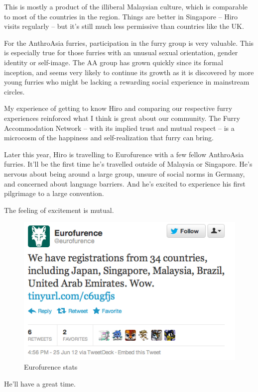 This is mostly a product of the illiberal Malaysian culture, which is comparable to most of the countries in the region. Things are better in Singapore -- Hiro visits regularly -- but it's still much less permissive than countries like the UK.

For the AnthroAsia furries, participation in the furry group is very valuable. This is especially true for those furries with an unusual sexual orientation, gender identity or self-image. The AA group has grown quickly since its formal inception, and seems very likely to continue its growth as it is discovered by more young furries who might be lacking a rewarding social experience in mainstream circles.

My experience of getting to know Hiro and comparing our respective furry experiences reinforced what I think is great about our community. The Furry Accommodation Network -- with its implied trust and mutual respect -- is a microcosm of the happiness and self-realization that furry can bring.

Later this year, Hiro is travelling to Eurofurence with a few fellow AnthroAsia furries. It'll be the first time he's travelled outside of Malaysia or Singapore. He's nervous about being around a large group, unsure of social norms in Germany, and concerned about language barriers. And he's excited to experience his first pilgrimage to a large convention.

The feeling of excitement is mutual.

\begin{figure}
  \begin{center}
    \includegraphics{content/assets/furry-accommodation--eftweet}
  \end{center}
  \caption{Eurofurence stats}
\end{figure}

He'll have a great time.
